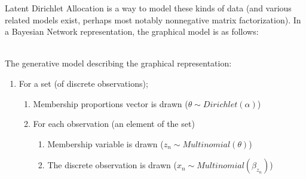 \documentclass{article}%
\begin{document}
Latent Dirichlet Allocation \cite{blei2003lda} is a way to model these kinds of data (and various related models exist, perhaps most notably nonnegative matrix factorization\cite{cemgil2009nmf}). In a Bayesian Network representation, the graphical model is as follows:
\begin{figure}[h]
	\end{figure}
\\The generative model describing the graphical representation:
	\begin{enumerate}
		\item For a set (of discrete observations);
		\begin{enumerate}
			\item Membership proportions vector is drawn ($\theta \sim Dirichlet(\alpha)$)
			\item For each observation (an element of the set)
			\begin{enumerate}
				\item Membership variable is drawn ($z_n \sim Multinomial(\theta)$)
				\item The discrete observation is drawn ($x_n \sim Multinomial(\beta_{z_n})$)
			\end{enumerate}
		\end{enumerate}
	\end{enumerate}
	
\end{document}
